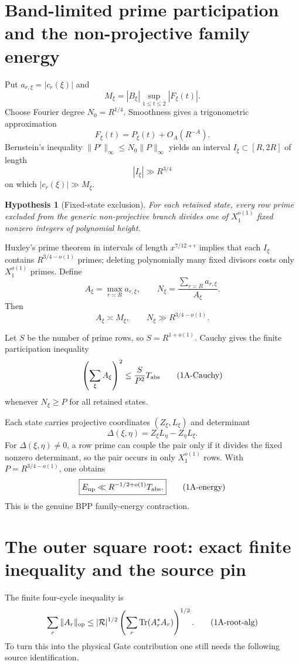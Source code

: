 \documentclass[11pt]{article}
\newtheorem{hypothesis}[theorem]{Hypothesis}
\theoremstyle{definition}
\theoremstyle{remark}
\newcommand{\1}{\mathbf 1}
\begin{document}
\section{Band-limited prime participation and the non-projective family energy}

Put $a_{r,\xi}=|c_r(\xi)|$ and
\[
 M_\xi=|B_\xi|\sup_{1\le t\le2}|F_\xi(t)|.
\]
Choose Fourier degree $N_0=R^{1/4}$.  Smoothness gives a trigonometric approximation
\[
 F_\xi(t)=P_\xi(t)+O_A(R^{-A}).
\]
Bernstein's inequality $\|P'\|_\infty\le N_0\|P\|_\infty$ yields an interval $I_\xi\subset[R,2R]$ of length
\[
 |I_\xi|\gg R^{3/4}
\]
on which $|c_r(\xi)|\gg M_\xi$.

\begin{hypothesis}[Fixed-state exclusion]\label{hyp:exclusion}
For each retained state, every row prime excluded from the generic non-projective branch divides one of
$X_1^{o(1)}$ fixed nonzero integers of polynomial height.
\end{hypothesis}

Huxley's prime theorem in intervals of length $x^{7/12+\epsilon}$ implies that each $I_\xi$ contains
$R^{3/4-o(1)}$ primes; deleting polynomially many fixed divisors costs only $X_1^{o(1)}$ primes.  Define
\[
 A_\xi=\max_{r\asymp R}a_{r,\xi},
 \qquad
 N_\xi=\frac{\sum_{r\asymp R}a_{r,\xi}}{A_\xi}.
\]
Then
\[
 A_\xi\asymp M_\xi,
 \qquad N_\xi\gg R^{3/4-o(1)}.
\tag{1A-part}
\]

Let $S$ be the number of prime rows, so $S=R^{1+o(1)}$.  Cauchy gives the finite participation inequality
\[
 \left(\sum_\xi A_\xi\right)^2\le \frac{S}{P^2}T_{\rm abs}
\tag{1A-Cauchy}
\]
whenever $N_\xi\ge P$ for all retained states.

Each state carries projective coordinates $(Z_\xi,L_\xi)$ and determinant
\[
 \Delta(\xi,\eta)=Z_\xi L_\eta-Z_\eta L_\xi.
\]
For $\Delta(\xi,\eta)\ne0$, a row prime can couple the pair only if it divides the fixed nonzero determinant,
so the pair occurs in only $X_1^{o(1)}$ rows.  With $P=R^{3/4-o(1)}$, one obtains
\[
 \boxed{E_{\rm np}\ll R^{-1/2+o(1)}T_{\rm abs}.}
\tag{1A-energy}
\]
This is the genuine BPP family-energy contraction.

\section{The outer square root: exact finite inequality and the source pin}

The finite four-cycle inequality is
\[
 \sum_r\|A_r\|_{\rm op}
 \le |\mathcal R|^{1/2}\left(\sum_r\operatorname{Tr}(A_r^*A_r)\right)^{1/2}.
\tag{1A-root-alg}
\]
To turn this into the physical Gate contribution one still needs the following source identification.
\end{document}
